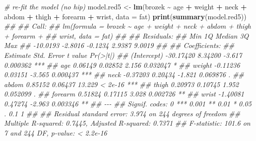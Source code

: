 \documentclass[
]{book}
\newenvironment{Shaded}{\begin{snugshade}}{\end{snugshade}}
\newcommand{\CommentTok}[1]{\textcolor[rgb]{0.56,0.35,0.01}{\textit{#1}}}
\newcommand{\DataTypeTok}[1]{\textcolor[rgb]{0.13,0.29,0.53}{#1}}
\newcommand{\KeywordTok}[1]{\textcolor[rgb]{0.13,0.29,0.53}{\textbf{#1}}}
\newcommand{\NormalTok}[1]{#1}
\newcommand{\OperatorTok}[1]{\textcolor[rgb]{0.81,0.36,0.00}{\textbf{#1}}}
\newcommand{\StringTok}[1]{\textcolor[rgb]{0.31,0.60,0.02}{#1}}
\theoremstyle{definition}
\theoremstyle{definition}
\theoremstyle{definition}
\theoremstyle{remark}
\begin{document}
\begin{Shaded}
\begin{Highlighting}[]
\CommentTok{\# re{-}fit the model (no hip)}
\NormalTok{model.red5 \textless{}{-}}\StringTok{ }\KeywordTok{lm}\NormalTok{(brozek }\OperatorTok{\textasciitilde{}}\StringTok{ }\NormalTok{age }\OperatorTok{+}\StringTok{ }\NormalTok{weight }\OperatorTok{+}\StringTok{ }\NormalTok{neck }\OperatorTok{+}\StringTok{ }\NormalTok{abdom  }\OperatorTok{+}\StringTok{ }\NormalTok{thigh  }\OperatorTok{+}\StringTok{ }\NormalTok{forearm }\OperatorTok{+}\StringTok{ }\NormalTok{wrist, }\DataTypeTok{data =}\NormalTok{ fat)}
\KeywordTok{print}\NormalTok{(}\KeywordTok{summary}\NormalTok{(model.red5))}
\CommentTok{\#\# }
\CommentTok{\#\# Call:}
\CommentTok{\#\# lm(formula = brozek \textasciitilde{} age + weight + neck + abdom + thigh + forearm + }
\CommentTok{\#\#     wrist, data = fat)}
\CommentTok{\#\# }
\CommentTok{\#\# Residuals:}
\CommentTok{\#\#      Min       1Q   Median       3Q      Max }
\CommentTok{\#\# {-}10.0193  {-}2.8016  {-}0.1234   2.9387   9.0019 }
\CommentTok{\#\# }
\CommentTok{\#\# Coefficients:}
\CommentTok{\#\#              Estimate Std. Error t value Pr(\textgreater{}|t|)    }
\CommentTok{\#\# (Intercept) {-}30.17420    8.34200  {-}3.617 0.000362 ***}
\CommentTok{\#\# age           0.06149    0.02852   2.156 0.032047 *  }
\CommentTok{\#\# weight       {-}0.11236    0.03151  {-}3.565 0.000437 ***}
\CommentTok{\#\# neck         {-}0.37203    0.20434  {-}1.821 0.069876 .  }
\CommentTok{\#\# abdom         0.85152    0.06437  13.229  \textless{} 2e{-}16 ***}
\CommentTok{\#\# thigh         0.20973    0.10745   1.952 0.052099 .  }
\CommentTok{\#\# forearm       0.51824    0.17115   3.028 0.002726 ** }
\CommentTok{\#\# wrist        {-}1.40081    0.47274  {-}2.963 0.003346 ** }
\CommentTok{\#\# {-}{-}{-}}
\CommentTok{\#\# Signif. codes:  0 \textquotesingle{}***\textquotesingle{} 0.001 \textquotesingle{}**\textquotesingle{} 0.01 \textquotesingle{}*\textquotesingle{} 0.05 \textquotesingle{}.\textquotesingle{} 0.1 \textquotesingle{} \textquotesingle{} 1}
\CommentTok{\#\# }
\CommentTok{\#\# Residual standard error: 3.974 on 244 degrees of freedom}
\CommentTok{\#\# Multiple R{-}squared:  0.7445,	Adjusted R{-}squared:  0.7371 }
\CommentTok{\#\# F{-}statistic: 101.6 on 7 and 244 DF,  p{-}value: \textless{} 2.2e{-}16}


\end{Highlighting}
\end{Shaded}
\end{document}
